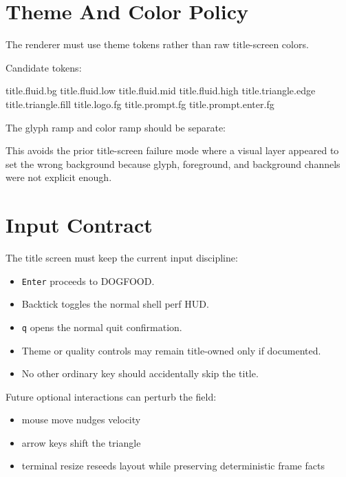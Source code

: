 \section{Theme And Color Policy}\label{record-114-theme-and-color-policy}

The renderer must use theme tokens rather than raw title-screen colors.

Candidate tokens:

\begin{CodeBlock}
title.fluid.bg
title.fluid.low
title.fluid.mid
title.fluid.high
title.triangle.edge
title.triangle.fill
title.logo.fg
title.prompt.fg
title.prompt.enter.fg
\end{CodeBlock}

The glyph ramp and color ramp should be separate:



This avoids the prior title-screen failure mode where a visual layer appeared to set the wrong background because glyph, foreground, and background channels were not explicit enough.

\section{Input Contract}\label{record-114-input-contract}

The title screen must keep the current input discipline:

\begin{itemize}
\tightlist
\item
  \texttt{E\allowbreak{}n\allowbreak{}t\allowbreak{}e\allowbreak{}r} proceeds to DOGFOOD.
\item
  Backtick toggles the normal shell perf HUD.
\item
  \texttt{q} opens the normal quit confirmation.
\item
  Theme or quality controls may remain title-owned only if documented.
\item
  No other ordinary key should accidentally skip the title.
\end{itemize}

Future optional interactions can perturb the field:

\begin{itemize}
\tightlist
\item
  mouse move nudges velocity
\item
  arrow keys shift the triangle
\item
  terminal resize reseeds layout while preserving deterministic frame facts
\end{itemize}

